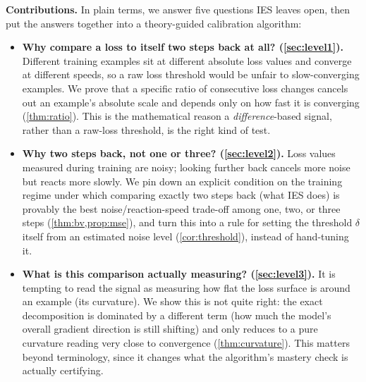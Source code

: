 \documentclass{article}
\theoremstyle{plain}
\theoremstyle{definition}
\theoremstyle{remark}
\begin{document}
\textbf{Contributions.} In plain terms, we answer five questions IES leaves open, then put the answers together into a theory-guided calibration algorithm:
\begin{itemize}
\item \textbf{Why compare a loss to itself two steps back at all? (\cref{sec:level1}).} Different training examples sit at different absolute loss values and converge at different speeds, so a raw loss threshold would be unfair to slow-converging examples. We prove that a specific ratio of consecutive loss changes cancels out an example's absolute scale and depends only on how fast it is converging (\cref{thm:ratio}). This is the mathematical reason a \emph{difference}-based signal, rather than a raw-loss threshold, is the right kind of test.
\item \textbf{Why two steps back, not one or three? (\cref{sec:level2}).} Loss values measured during training are noisy; looking further back cancels more noise but reacts more slowly. We pin down an explicit condition on the training regime under which comparing exactly two steps back (what IES does) is provably the best noise/reaction-speed trade-off among one, two, or three steps (\cref{thm:bv,prop:mse}), and turn this into a rule for setting the threshold $\delta$ itself from an estimated noise level (\cref{cor:threshold}), instead of hand-tuning it.
\item \textbf{What is this comparison actually measuring? (\cref{sec:level3}).} It is tempting to read the signal as measuring how flat the loss surface is around an example (its curvature). We show this is not quite right: the exact decomposition is dominated by a different term (how much the model's overall gradient direction is still shifting) and only reduces to a pure curvature reading very close to convergence (\cref{thm:curvature}). This matters beyond terminology, since it changes what the algorithm's mastery check is actually certifying.

\end{itemize}
\end{document}
